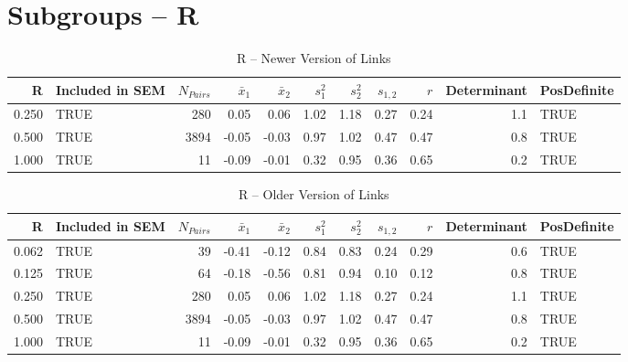 \documentclass{article}\usepackage[]{graphicx}\usepackage[]{color}
\begin{document}
\section{Subgroups --  R }%
\begin{table}[ht]
\centering
\begin{tabular}{rlrrrrrrrrl}
  \hline
R & Included in SEM & $N_{Pairs}$ & $\bar{x}_1$ & $\bar{x}_2$ & $s_1^2$ & $s_2^2$ & $s_{1,2}$ & $r$ & Determinant & PosDefinite \\ 
  \hline
0.250 & TRUE & 280 & 0.05 & 0.06 & 1.02 & 1.18 & 0.27 & 0.24 & 1.1 & TRUE \\ 
  0.500 & TRUE & 3894 & -0.05 & -0.03 & 0.97 & 1.02 & 0.47 & 0.47 & 0.8 & TRUE \\ 
  1.000 & TRUE & 11 & -0.09 & -0.01 & 0.32 & 0.95 & 0.36 & 0.65 & 0.2 & TRUE \\ 
   \hline
\end{tabular}
\caption{R -- Newer Version of Links} 
\end{table}
\begin{table}[ht]
\centering
\begin{tabular}{rlrrrrrrrrl}
  \hline
R & Included in SEM & $N_{Pairs}$ & $\bar{x}_1$ & $\bar{x}_2$ & $s_1^2$ & $s_2^2$ & $s_{1,2}$ & $r$ & Determinant & PosDefinite \\ 
  \hline
0.062 & TRUE & 39 & -0.41 & -0.12 & 0.84 & 0.83 & 0.24 & 0.29 & 0.6 & TRUE \\ 
  0.125 & TRUE & 64 & -0.18 & -0.56 & 0.81 & 0.94 & 0.10 & 0.12 & 0.8 & TRUE \\ 
  0.250 & TRUE & 280 & 0.05 & 0.06 & 1.02 & 1.18 & 0.27 & 0.24 & 1.1 & TRUE \\ 
  0.500 & TRUE & 3894 & -0.05 & -0.03 & 0.97 & 1.02 & 0.47 & 0.47 & 0.8 & TRUE \\ 
  1.000 & TRUE & 11 & -0.09 & -0.01 & 0.32 & 0.95 & 0.36 & 0.65 & 0.2 & TRUE \\ 
   \hline
\end{tabular}
\caption{R -- Older Version of Links} 
\end{table}
\newpage 
\end{document}
